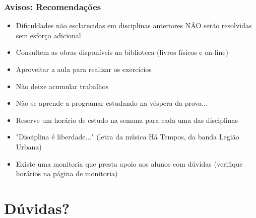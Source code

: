 \documentclass[aspectratio=169]{beamer}
\begin{document}
\begin{frame}\frametitle{Avisos: Recomendações}
\begin{itemize}
	\item Dificuldades não esclarecidas em disciplinas anteriores NÃO serão resolvidas sem esforço adicional
	\item Consultem as obras disponíveis na biblioteca (livros físicos e on-line)
	\item Aproveitar a aula para realizar os exercícios
	\item Não deixe acumular trabalhos
	\item Não se aprende a programar estudando na véspera da prova...
	\item Reserve um horário de estudo na semana para cada uma das disciplinas
	\item "Disciplina é liberdade..." (letra da música Há Tempos, da banda Legião Urbana)
	\item Existe uma monitoria que presta apoio aos alunos com dúvidas (verifique horários na página de monitoria)
\end{itemize}
\end{frame}

\section{Dúvidas?}
\end{document}
